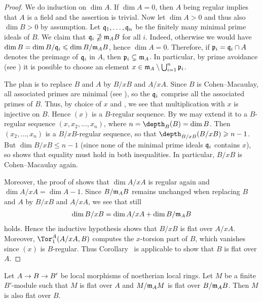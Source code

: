 \documentclass[a4paper,parskip=half,numbers=enddot, DIV=12]{scrreprt}
\renewcommand{\geq}{\geqslant}
\renewcommand{\leq}{\leqslant}
\begin{document}
\begin{proof}
	We do induction on $\dim A$. If $\dim A=0$, then $A$ being regular implies that $A$ is a field and the assertion is trivial. Now let $\dim A>0$ and thus also $\dim B>0$ by assumption. Let $\mathfrak{q}_1,\ldots,\mathfrak{q}_n$ be the finitely many minimal prime ideals of $B$. We claim that $\mathfrak{q}_i\nsupseteq \mathfrak{m}_AB$ for all $i$. Indeed, otherwise we would have $\dim B=\dim B/\qq_i\leq \dim B/\mm_AB$, hence $\dim A=0$. Therefore, if $\mathfrak{p}_i=\mathfrak{q}_i\cap A$ denotes the preimage of $\mathfrak{q}_i$ in $A$, then $\mathfrak{p}_i\subsetneq \mathfrak{m}_A$. In particular, by prime avoidance (see \cite[Lemma~2.5.1]{alg1}) it is possible to choose an element $x\in\mathfrak{m}_A\setminus\bigcup_{i=1}^n\mathfrak{p}_i$.
	
	The plan is to replace $B$ and $A$ by $B/xB$ and $A/xA$. Since $B$ is Cohen--Macaulay, all associated primes are minimal (see \cite[Corollary~2.4.2]{stacks-project}), so the $\mathfrak{q}_i$ comprise all the associated primes of $B$. Thus, by choice of $x$ and \cite[Proposition~A.3.3]{homalg}, we see that multiplication with $x$ is injective on $B$. Hence $(x)$ is a $B$-regular sequence. By \cite[Proposition~2.3.2]{homalg} we may extend it to a $B$-regular sequence $(x,x_2,\ldots,x_n)$, where $n=\depth_B(B)=\dim B$. Then $(x_2,\ldots,x_n)$ is a $B/xB$-regular sequence, so that $\depth_{B/xB}(B/xB)\geq n-1$. But $\dim B/xB\leq n-1$ (since none of the minimal prime ideals $\mathfrak{q}_i$ contains $x$), so \cite[Fact~2.4.1]{homalg} shows that equality must hold in both inequalities. In particular, $B/xB$ is Cohen--Macaulay again.
	
	Moreover, the proof of \cite[Proposition~2.2.1]{homalg} shows that $\dim A/xA$ is regular again and $\dim A/xA=\dim A-1$. Since $B/\mathfrak{m}_AB$ remains unchanged when replacing $B$ and $A$ by $B/xB$ and $A/xA$, we see that still
	\begin{align*}
		\dim B/xB=\dim A/xA+\dim B/\mathfrak{m}_AB
	\end{align*}
	holds. Hence the inductive hypothesis shows that $B/xB$ is flat over $A/xA$. Moreover, $\Tor_1^A(A/xA,B)$ computes the $x$-torsion part of $B$, which vanishes since $(x)$ is $B$-regular. Thus Corollary~ is applicable to show that $B$ is flat over $A$.
\end{proof}
\begin{lem}
	Let $A\morphism B\morphism B'$ be local morphisms of noetherian local rings. Let $M$ be a finite $B'$-module such that $M$ is flat over $A$ and $M/\mathfrak{m}_AM$ is flat over $B/\mathfrak{m}_AB$. Then $M$ is also flat over $B$.
\end{lem}
\end{document}
